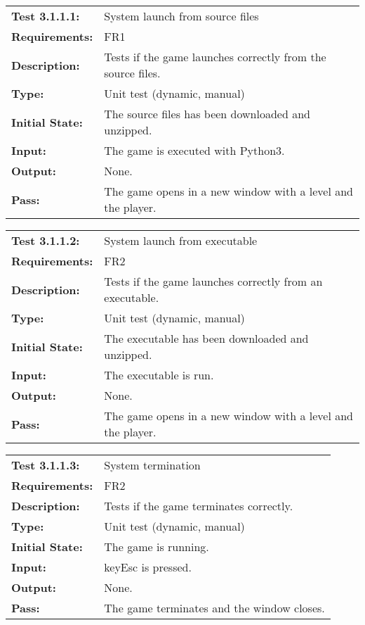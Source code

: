 \documentclass[12pt, titlepage]{article}
\begin{document}
\begin{tabular}{|l|p{10cm}|}
    \hline
    \bf{Test} 3.1.1.1: & System launch from source files \\
    \bf{Requirements}: & FR1 \\
    \bf{Description}: & Tests if the game launches correctly from the source files. \\
    \bf{Type}: & Unit test (dynamic, manual) \\
    \bf{Initial State}: & The source files has been downloaded and unzipped. \\
    \bf{Input}: & The game is executed with Python3. \\
    \bf{Output}: & None. \\
    \bf{Pass}: & The game opens in a new window with a level and the player. \\
    \hline
\end{tabular}

\begin{tabular}{|l|p{10cm}|}
    \hline
    \bf{Test} 3.1.1.2: & System launch from executable \\
    \bf{Requirements}: & FR2 \\
    \bf{Description}: & Tests if the game launches correctly from an executable. \\
    \bf{Type}: & Unit test (dynamic, manual) \\
    \bf{Initial State}: & The executable has been downloaded and unzipped. \\
    \bf{Input}: & The executable is run. \\
    \bf{Output}: & None. \\
    \bf{Pass}: & The game opens in a new window with a level and the player. \\
    \hline
\end{tabular}

\begin{tabular}{|l|p{10cm}|}
    \hline
    \bf{Test} 3.1.1.3: & System termination \\
    \bf{Requirements}: & FR2 \\
    \bf{Description}: & Tests if the game terminates correctly. \\
    \bf{Type}: & Unit test (dynamic, manual) \\
    \bf{Initial State}: & The game is running. \\
    \bf{Input}: & keyEsc is pressed. \\
    \bf{Output}: & None. \\
    \bf{Pass}: & The game terminates and the window closes. \\
    \hline
\end{tabular}
\end{document}
